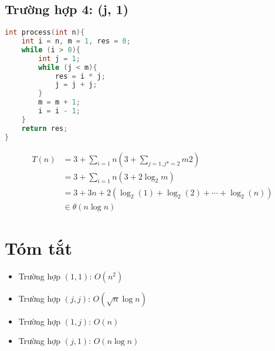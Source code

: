 \documentclass[12pt,a4paper]{article}
\begin{document}
\subsection*{Trường hợp 4: (j, 1)}
\begin{lstlisting}[language=C++]
int process(int n){
    int i = n, m = 1, res = 0;
    while (i > 0){
        int j = 1;
        while (j < m){
            res = i * j;
            j = j + j;
        }
        m = m + 1;
        i = i - 1;
    }
    return res;
}
\end{lstlisting}
\begin{align*}
    T(n)&=3+\sum_{i=1}{n}(3+\sum_{j=1,j*=2}{m}2)\\
    &=3+\sum_{i=1}{n}(3+2\log_{2}m)\\
    &=3+3n+2(\log_{2}(1)+\log_{2}(2)+\cdots+\log_{2}(n))\\
    &\in \theta(n\log n)
\end{align*}
\section*{Tóm tắt}
\begin{itemize}
    \item Trường hợp $(1,1)$: $O(n^2)$
    \item Trường hợp $(j,j)$: $O(\sqrt{n} \log n)$
    \item Trường hợp $(1,j)$: $O(n)$
    \item Trường hợp $(j,1)$: $O(n \log n)$
\end{itemize}
\end{document}
